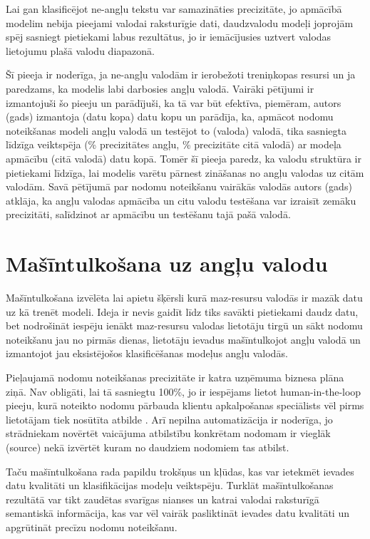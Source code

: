 Lai gan klasificējot ne-angļu tekstu var samazināties precizitāte, jo apmācībā modelim nebija pieejami valodai raksturīgie dati, daudzvalodu modeļi joprojām spēj sasniegt pietiekami labus rezultātus, jo ir iemācījusies uztvert valodas lietojumu plašā valodu diapazonā.

Šī pieeja ir noderīga, ja ne-angļu valodām ir ierobežoti treniņkopas resursi un ja paredzams, ka modelis labi darbosies angļu valodā. Vairāki pētījumi ir izmantojuši šo pieeju un parādījuši, ka tā var būt efektīva, piemēram, autors (gads) izmantoja (datu kopa) datu kopu un parādīja, ka, apmācot nodomu noteikšanas modeli angļu valodā un testējot to (valoda) valodā, tika sasniegta līdzīga veiktspēja (\% precizitātes angļu, \% precizitāte citā valodā) ar modeļa apmācību (citā valodā) datu kopā. Tomēr šī pieeja paredz, ka valodu struktūra ir pietiekami līdzīga, lai modelis varētu pārnest zināšanas no angļu valodas uz citām valodām. Savā pētījumā par nodomu noteikšanu vairākās valodās autors (gads) atklāja, ka angļu valodas apmācība un citu valodu testēšana var izraisīt zemāku precizitāti, salīdzinot ar apmācību un testēšanu tajā pašā valodā.


\section{Mašīntulkošana uz angļu valodu}


Mašīntulkošana izvēlēta lai apietu šķērsli kurā maz-resursu valodās ir mazāk datu uz kā trenēt modeli. Ideja ir nevis gaidīt līdz tiks savākti pietiekami daudz datu, bet nodrošināt iespēju ienākt maz-resursu valodas lietotāju tirgū un sākt nodomu noteikšanu jau no pirmās dienas, lietotāju ievadus mašīntulkojot angļu valodā un izmantojot jau eksistējošos klasificēšanas modeļus angļu valodās. 

Pieļaujamā nodomu noteikšanas precizitāte ir katra uzņēmuma biznesa plāna ziņā. Nav obligāti, lai tā sasniegtu 100\%, jo ir iespējams lietot human-in-the-loop pieeju, kurā noteikto nodomu pārbauda klientu apkalpošanas speciālists vēl pirms lietotājam tiek nosūtīta atbilde \cite{paikens2020}. Arī nepilna automatizācija ir noderīga, jo strādniekam novērtēt vaicājuma atbilstību konkrētam nodomam ir vieglāk (source) nekā izvērtēt kuram no daudziem nodomiem tas atbilst.

Taču mašīntulkošana rada papildu trokšņus un kļūdas, kas var ietekmēt ievades datu kvalitāti un klasifikācijas modeļu veiktspēju. Turklāt mašīntulkošanas rezultātā var tikt zaudētas svarīgas nianses un katrai valodai raksturīgā semantiskā informācija, kas var vēl vairāk pasliktināt ievades datu kvalitāti un apgrūtināt precīzu nodomu noteikšanu.


